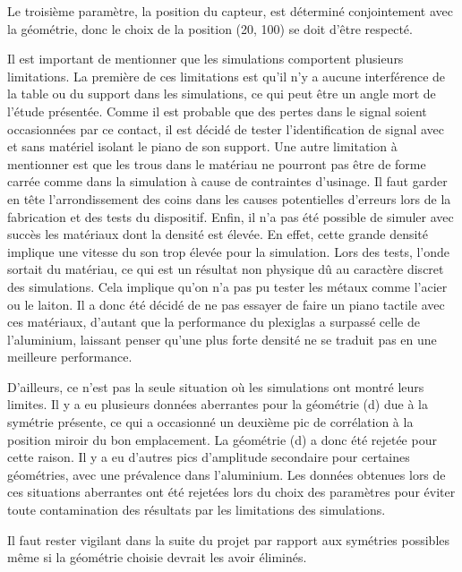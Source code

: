 \documentclass[conference]{IEEEtran}
\begin{document}
Le troisième paramètre, la position du capteur, est déterminé conjointement avec 
la géométrie, donc le choix de la position (20, 100) se doit d'être respecté. 

Il est important de mentionner que les simulations comportent plusieurs limitations.
La première de ces limitations est qu'il n'y a aucune interférence de la table ou 
du support dans les simulations, ce qui peut être un angle mort de l'étude présentée.
Comme il est probable que des pertes dans le signal soient occasionnées par ce
contact, il est décidé de tester l'identification de signal avec et sans matériel 
isolant le piano de son support. Une autre limitation à mentionner est que les trous
dans le matériau ne pourront pas être de forme carrée comme dans la simulation à 
cause de contraintes d'usinage. Il faut garder en tête l'arrondissement des coins dans
les causes potentielles d'erreurs lors de la fabrication et des tests du dispositif.
Enfin, il n'a pas été possible de simuler avec succès les matériaux dont la densité
est élevée. En effet, cette grande densité implique une vitesse du son trop élevée
pour la simulation. Lors des tests, l'onde sortait du matériau, ce qui est un résultat
non physique dû au caractère discret des simulations. Cela implique qu'on n'a pas pu 
tester les métaux comme l'acier ou le laiton. Il a donc été décidé de ne pas essayer
de faire un piano tactile avec ces matériaux, d'autant que la performance du plexiglas
a surpassé celle de l'aluminium, laissant penser qu'une plus forte densité ne se 
traduit pas en une meilleure performance.

D'ailleurs, ce n'est pas la seule situation où les simulations ont montré leurs 
limites. Il y a eu plusieurs données aberrantes pour la géométrie (d) due à la symétrie 
présente, ce qui a occasionné un deuxième pic de corrélation à la position miroir du
bon emplacement. La géométrie (d) a donc été rejetée pour cette raison. Il y a eu 
d'autres pics d'amplitude secondaire pour certaines géométries, avec une prévalence 
dans l'aluminium. Les données obtenues lors de ces situations aberrantes ont été 
rejetées lors du choix des paramètres pour éviter toute contamination des résultats 
par les limitations des simulations.

Il faut rester vigilant dans la suite du projet par rapport aux symétries possibles 
même si la géométrie choisie devrait les avoir éliminés. 

\clearpage

% 
% 
\end{document}
